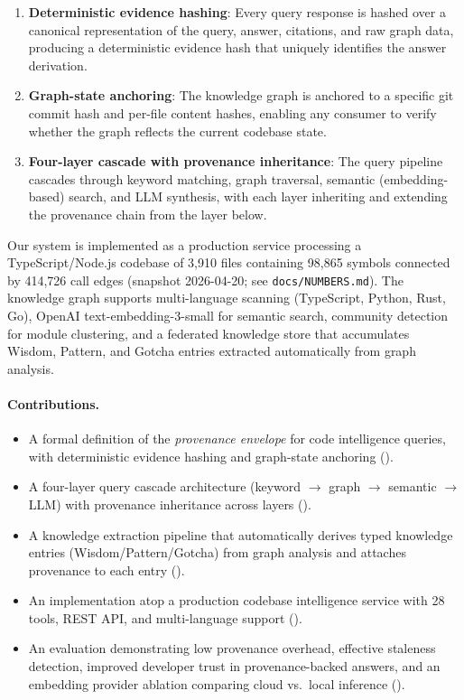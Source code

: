 \documentclass[conference]{IEEEtran}
\begin{document}
\begin{enumerate}
  \item \textbf{Deterministic evidence hashing}: Every query response
    is hashed over a canonical representation of the query, answer,
    citations, and raw graph data, producing a deterministic evidence
    hash that uniquely identifies the answer derivation.

  \item \textbf{Graph-state anchoring}: The knowledge graph is
    anchored to a specific git commit hash and per-file content hashes,
    enabling any consumer to verify whether the graph reflects the
    current codebase state.

  \item \textbf{Four-layer cascade with provenance inheritance}: The
    query pipeline cascades through keyword matching, graph traversal,
    semantic (embedding-based) search, and LLM synthesis, with each
    layer inheriting and extending the provenance chain from the layer
    below.
\end{enumerate}

Our system is implemented as a production service processing a
TypeScript/Node.js codebase of 3,910 files containing 98,865 symbols
connected by 414,726 call edges (snapshot 2026-04-20; see \texttt{docs/NUMBERS.md}). The knowledge graph supports
multi-language scanning (TypeScript, Python, Rust, Go), OpenAI
text-embedding-3-small for semantic search, community detection for
module clustering, and a federated knowledge store that accumulates
Wisdom, Pattern, and Gotcha entries extracted automatically from graph
analysis.

\paragraph{Contributions.}
\begin{itemize}
  \item A formal definition of the \emph{provenance envelope} for code
    intelligence queries, with deterministic evidence hashing and
    graph-state anchoring ().
  \item A four-layer query cascade architecture (keyword $\to$ graph
    $\to$ semantic $\to$ LLM) with provenance inheritance across layers
    ().
  \item A knowledge extraction pipeline that automatically derives
    typed knowledge entries (Wisdom/Pattern/Gotcha) from graph analysis
    and attaches provenance to each entry ().
  \item An implementation atop a production codebase intelligence
    service with 28 tools, REST API, and multi-language support
    ().
  \item An evaluation demonstrating low provenance overhead, effective
    staleness detection, improved developer trust in provenance-backed
    answers, and an embedding provider ablation comparing cloud vs.\
    local inference ().
\end{itemize}
\end{document}
